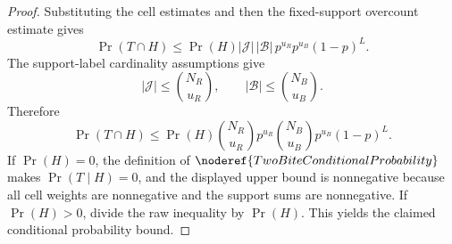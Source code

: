\begin{proof}
Substituting the cell estimates and then the fixed-support overcount estimate
gives
\[
\Pr(T\cap H)\le
\Pr(H)
|\mathcal J|\,|\mathcal B|\,
p^{u_R}p^{u_B}(1-p)^L .
\]
The support-label cardinality assumptions give
\[
|\mathcal J|\le\binom{N_R}{u_R},
\qquad
|\mathcal B|\le\binom{N_B}{u_B}.
\]
Therefore
\[
\Pr(T\cap H)\le
\Pr(H)\binom{N_R}{u_R}p^{u_R}
\binom{N_B}{u_B}p^{u_B}(1-p)^L .
\]
If \(\Pr(H)=0\), the definition of
\(\noderef{TwoBiteConditionalProbability}\) makes \(\Pr(T\mid H)=0\), and
the displayed upper bound is nonnegative because all cell weights are
nonnegative and the support sums are nonnegative.  If \(\Pr(H)>0\), divide
the raw inequality by \(\Pr(H)\).  This yields the claimed conditional
probability bound.
\end{proof}
